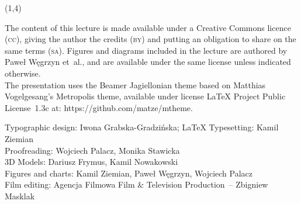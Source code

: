 {\begin{frame}[standout]
\begin{textblock}{4.2}
    \end{textblock}





    \begin{textblock}{11}(1,4)

      \begin{flushleft}

        \mdseries

        \footnotesize

        \RaggedRight

        \color{jFrametitleFGColor}

        The content of this lecture is made available under a Creative
        Commons licence (\textsc{cc}), giving the author the credits
        (\textsc{by}) and putting an obligation to share on the same terms
        (\textsc{sa}). Figures and diagrams included in the lecture are
        authored by Paweł Węgrzyn et~al., and are available under the same
        license unless indicated otherwise.\\ The presentation uses the
        Beamer Jagiellonian theme based on Matthias Vogelgesang’s
        Metropolis theme, available under license \LaTeX{} Project
        Public License~1.3c at: 
        {https://github.com/matze/mtheme}.

        Typographic design: Iwona Grabska-Gradzińska;
        \LaTeX{} Typesetting: Kamil Ziemian \\
        Proofreading: Wojciech Palacz,
        Monika Stawicka \\
        3D Models: Dariusz Frymus, Kamil Nowakowski \\
        Figures and charts: Kamil Ziemian, Paweł Węgrzyn, Wojciech
        Palacz \\
        Film editing: Agencja Filmowa Film \& Television Production~--
        Zbigniew Masklak

      \end{flushleft}

    \end{textblock}

  \end{frame}
}



